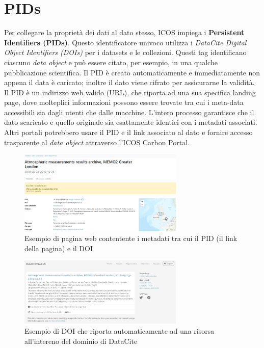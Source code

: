 \section{PIDs}
Per collegare la proprietà dei dati al dato stesso, ICOS impiega i \textbf{Persistent Identifiers (PIDs)}.
Questo identificatore univoco utilizza i \textit{DataCite Digital Object Identifiers (DOIs)} per i datasets
e le collezioni. Questi tag identificano ciascuno \textit{data object} e può essere citato, per esempio,
in una qualche pubblicazione scientifica. Il PID è creato automaticamente e immediatamente
non appena il data è caricato; inoltre il dato viene cifrato per assicurarne la validità.\\

Il PID è un indirizzo web valido (URL), che riporta ad una sua specifica landing page,
dove molteplici informazioni possono essere trovate tra cui i meta-data accessibili sia
dagli utenti che dalle macchine. L'intero processo garantisce che il dato scaricato e quello
originale sia esattamente identici con i metadati associati. Altri portali 
potrebbero usare il PID e il link associato al dato e fornire accesso trasparente al \textit{data object}
attraverso l'ICOS Carbon Portal.

\begin{figure}[h!]
    \centering
    \includegraphics[width=0.7\textwidth]{figures/PIDex.JPG}
    \caption{Esempio di pagina web contentente i metadati tra cui il PID (il link della pagina) e il DOI}
    \label{figure:PIDex}
\end{figure}

\begin{figure}[h!]
    \centering
    \includegraphics[width=0.7\textwidth]{figures/DOIex.JPG}
    \caption{Esempio di DOI che riporta automaticamente ad una risorsa all'intereno del dominio di DataCite}
    \label{figure:DOIex}
\end{figure}


